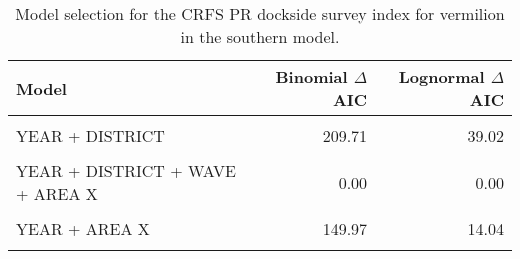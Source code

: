 \documentclass[
]{article}
\begin{document}
\begin{table}

\caption{\label{tab:tab-model-select-crfspr}Model selection for the CRFS PR dockside survey index for vermilion in the southern model.}
\centering
\begin{tabular}[t]{lrr}
\toprule
Model & Binomial $\Delta$AIC & Lognormal $\Delta$AIC\\
\midrule
\cellcolor{gray!6}{1} & \cellcolor{gray!6}{328.75} & \cellcolor{gray!6}{168.29}\\
YEAR + DISTRICT & 209.71 & 39.02\\
\cellcolor{gray!6}{YEAR + DISTRICT + WAVE} & \cellcolor{gray!6}{65.11} & \cellcolor{gray!6}{29.58}\\
YEAR + DISTRICT + WAVE + AREA X & 0.00 & 0.00\\
\cellcolor{gray!6}{YEAR + WAVE + AREA X} & \cellcolor{gray!6}{2.48} & \cellcolor{gray!6}{5.11}\\
\addlinespace
YEAR + AREA X & 149.97 & 14.04\\
\cellcolor{gray!6}{YEAR + DISTRICT + AREA X} & \cellcolor{gray!6}{145.89} & \cellcolor{gray!6}{9.79}\\
\bottomrule
\end{tabular}
\end{table}

\FloatBarrier
\end{document}
